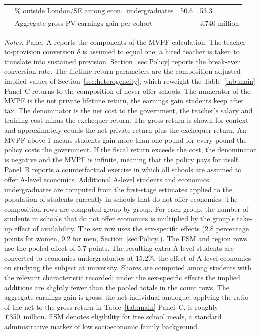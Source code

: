 \begin{table}[htbp]
\begin{tabular}{l l r l}
             & \% outside London/SE among econ.\ undergraduates
                                                        & 50.6            & 53.3 \\
\addlinespace
             & Aggregate gross PV earnings gain per cohort &            & \pounds 740 million \\
\bottomrule
\end{tabular}
\begin{minipage}{\textwidth}
\smallskip
\footnotesize
\textit{Notes:} Panel~A reports the components of the MVPF calculation. The teacher-to-provision conversion $\delta$ is assumed to equal one: a hired teacher is taken to translate into sustained provision. Section~\ref{sec:Policy} reports the break-even conversion rate. The lifetime return parameters are the composition-adjusted implied values of Section~\ref{sec:heterogeneity}, which reweight the Table~\ref{tab:main} Panel~C returns to the composition of never-offer schools. The numerator of the MVPF is the net private lifetime return, the earnings gain students keep after tax. The denominator is the net cost to the government, the teacher's salary and training cost minus the exchequer return. The gross return is shown for context and approximately equals the net private return plus the exchequer return. An MVPF above 1 means students gain more than one pound for every pound the policy costs the government. If the fiscal return exceeds the cost, the denominator is negative and the MVPF is infinite, meaning that the policy pays for itself. Panel~B reports a counterfactual exercise in which all schools are assumed to offer A-level economics. Additional A-level students and economics undergraduates are computed from the first-stage estimates applied to the population of students currently in schools that do not offer economics. The composition rows are computed group by group. For each group, the number of students in schools that do not offer economics is multiplied by the group's take-up effect of availability. The sex row uses the sex-specific effects (2.8 percentage points for women, 9.2 for men, Section~\ref{sec:Policy}). The FSM and region rows use the pooled effect of 5.7 points. The resulting extra A-level students are converted to economics undergraduates at 15.2\%, the effect of A-level economics on studying the subject at university. Shares are computed among students with the relevant characteristic recorded; under the sex-specific effects the implied additions are slightly fewer than the pooled totals in the count rows. The aggregate earnings gain is gross; the net individual analogue, applying the ratio of the net to the gross return in Table~\ref{tab:main} Panel~C, is roughly \pounds 350~million. FSM denotes eligibility for free school meals, a standard administrative marker of low socioeconomic family background.
\end{minipage}
\end{table}
